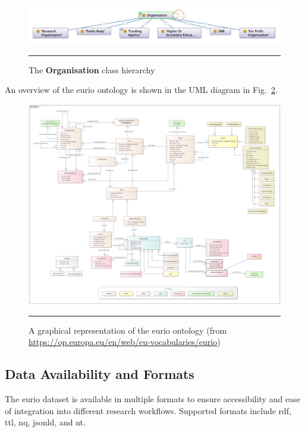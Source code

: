 \begin{figure}[htbp]
    \centering
 \includegraphics[width=\textwidth]{03_Figures/research-methods/organisation-class-hierarchy.png}
     \rule{35em}{0.5pt}
    \caption{The \textbf{Organisation} class hierarchy}
 \label{fig:organisation-class-hierarchy}
\end{figure}

An overview of the \gls{eurio} ontology is shown in the UML diagram in Fig.~\ref{fig:eurio-ontology}.

\begin{figure}[htbp]
    \centering
 \includegraphics[width=\textwidth]{03_Figures/research-methods/EURIO_V2.4.png}
     \rule{35em}{0.5pt}
    \caption{A graphical representation of the \gls{eurio} ontology (from \url{https://op.europa.eu/en/web/eu-vocabularies/eurio})}
 \label{fig:eurio-ontology}
\end{figure}

\subsection*{Data Availability and Formats}

The \gls{eurio} dataset is available in multiple formats to ensure accessibility and ease of integration into different research workflows.
Supported formats include \gls{rdf}, \gls{ttl}, \gls{nq}, \gls{jsonld}, and \gls{nt}.